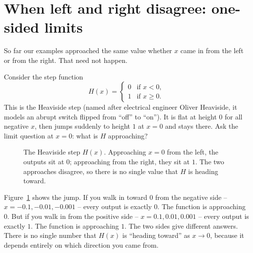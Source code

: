 \section{When left and right disagree: one-sided limits}

So far our examples approached the same value whether $x$ came in from the left or from the
right. That need not happen.

Consider the step function
\[
  H(x) = \begin{cases} 0 & \text{if } x < 0, \\[2pt] 1 & \text{if } x \ge 0. \end{cases}
\]
This is the Heaviside step (named after electrical engineer Oliver Heaviside, it models an abrupt
switch flipped from ``off'' to ``on''). It is flat at height $0$ for all negative $x$, then jumps
suddenly to height $1$ at $x = 0$ and stays there. Ask the limit question at $x = 0$: what is $H$
approaching?

\begin{figure}[htbp]
\centering
{}
\caption{The Heaviside step $H(x)$. Approaching $x=0$ from the left, the outputs sit at $0$;
approaching from the right, they sit at $1$. The two approaches disagree, so there is no single
value that $H$ is heading toward.}
\label{ch05:heaviside}
\end{figure}

Figure~\ref{ch05:heaviside} shows the jump. If you walk in toward $0$ from the negative side --
$x = -0.1, -0.01, -0.001$ -- every output is exactly $0$. The function is approaching $0$. But if you walk in from the positive side --
$x = 0.1, 0.01, 0.001$ -- every output is exactly $1$. The function is approaching $1$. The two
sides give different answers. There is no single number that $H(x)$ is ``heading toward'' as $x
\to 0$, because it depends entirely on which direction you came from.


